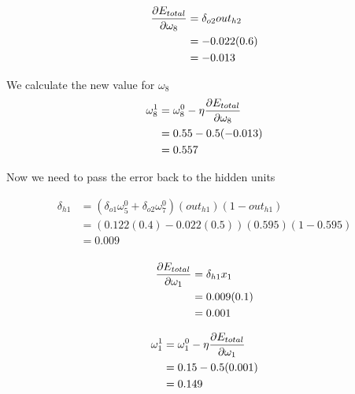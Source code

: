 \documentclass[10pt,a4paper]{article}
\begin{document}
\begin{equation}
\begin{split}
\pdv{E_{total}}{\omega_8} &= \delta_{o2}out_{h2}\\
                          &= -0.022(0.6)\\
                          &= -0.013\\
\end{split}
\end{equation}

We calculate the new value for $\omega_8$
\begin{equation}
\begin{split}
\omega_8^1 &= \omega_8^0 - \eta\pdv{E_{total}}{\omega_8}\\
           &= 0.55 -0.5(-0.013)\\
           &= 0.557\\
\end{split}
\end{equation}







Now we need to pass the error back to the hidden units

\begin{equation}
\begin{split}
\delta_{h1} &= (\delta_{o1}\omega_5^0 + \delta_{o2}\omega_7^0)(out_{h1})(1-out_{h1})\\
&= (0.122(0.4) -0.022(0.5))(0.595)(1-0.595)\\
&= 0.009\\
\end{split}
\end{equation}

\begin{equation}
\begin{split}
\pdv{E_{total}}{\omega_1} &= \delta_{h1}x_1\\ 
                          &= 0.009(0.1)\\
                          &= 0.001\\
\end{split}
\end{equation}

\begin{equation}
\begin{split}
\omega_1^1 &= \omega_1^0 - \eta\pdv{E_{total}}{\omega_1}\\
           &= 0.15 -0.5(0.001)\\
           &= 0.149\\
\end{split}
\end{equation}
\end{document}
